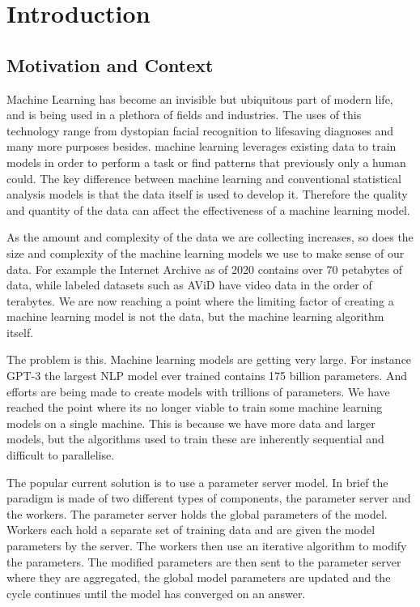 
\section{Introduction}

\subsection{Motivation and Context}

Machine Learning has become an invisible but ubiquitous part of modern life, and
is being used in a plethora of fields and industries. The uses of this
technology range from dystopian facial recognition
\cite{mattBurgessFacialRecognision} to lifesaving diagnoses
\cite{Mammograms2020} and many more purposes besides. machine learning leverages
existing data to train models in order to perform a task or find patterns that
previously only a human could. The key difference between machine learning and
conventional statistical analysis models is that the data itself is used to
develop it. Therefore the quality and quantity of the data can affect the
effectiveness of a machine learning model.
\par
As the amount and complexity of the data we are collecting increases, so does the
size and complexity of the machine learning models we use to make sense of our
data. For example the Internet Archive as of 2020 contains over 70 petabytes of
data, while labeled datasets such as AViD have video data in the order of
terabytes. \cite{piergiovanni2020avid} We are now reaching a point where the
limiting factor of creating a machine learning model is not the data, but the
machine learning algorithm itself.
\par
The problem is this. Machine learning models are getting very large. For
instance GPT-3 the largest NLP model ever trained contains 175 billion
parameters. \cite{fewshowlearners2020gpt} And efforts are being made to create
models with trillions of parameters. \cite{rajbhandari2020zero} We have reached
the point where its no longer viable to train some machine learning models on a
single machine.\cite{LI2014ParameterServers} This is because we have more data
and larger models, but the algorithms used to train these are inherently
sequential and difficult to parallelise.
\par
The popular current solution is to use a parameter server model. In brief the
paradigm is made of two different types of components, the parameter server and
the workers. The parameter server holds the global parameters of the model.
Workers each hold a separate set of training data and are given the model
parameters by the server. The workers then use an iterative algorithm to modify
the parameters. The modified parameters are then sent to the parameter server
where they are aggregated, the global model parameters are updated and the cycle
continues until the model has converged on an answer.


